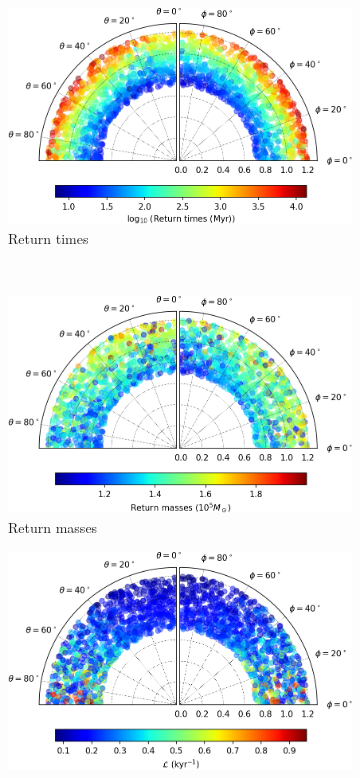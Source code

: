 \begin{figure}[h]
    \centering
    \begin{subfigure}[t]{0.4\textwidth}
        \includegraphics[width = \textwidth]{"../Files/Week 13/images/22_time"}
        \caption{Return times}
    \end{subfigure}
    ~ 
    \begin{subfigure}[t]{0.4\textwidth}
        \includegraphics[width=\textwidth]{"../Files/Week 13/images/22_mass"}
        \caption{Return masses}
    \end{subfigure}
    \begin{subfigure}[t]{0.4\textwidth}
        \includegraphics[width=\textwidth]{"../Files/Week 13/images/22_lyapunov"}

\end{subfigure}
\end{figure}
